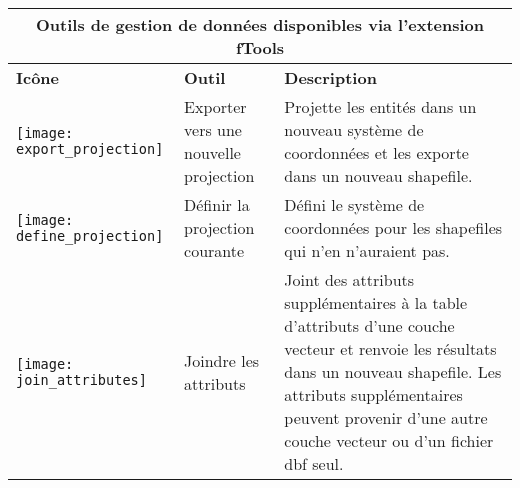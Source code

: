 \begin{table}[ht]
\centering

\begin{tabular}{|m{1cm}|m{3cm}|m{9cm}|}
 \hline \multicolumn{3}{|c|}{\textbf{Outils de gestion de données disponibles via l'extension fTools}} \\
 \hline \textbf{Icône} & \textbf{Outil} & \textbf{Description} \\
 \hline \texttt{[image: export\_projection]} & Exporter vers une nouvelle projection & Projette les entités dans un nouveau système de coordonnées et les exporte dans un nouveau shapefile. \\
 \hline \texttt{[image: define\_projection]} & Définir la projection courante & Défini le système de coordonnées pour les shapefiles qui n'en n'auraient pas. \\
 \hline \texttt{[image: join\_attributes]} & Joindre les attributs & Joint des attributs supplémentaires à la table d'attributs d'une couche vecteur et renvoie les résultats dans un nouveau shapefile. Les attributs supplémentaires peuvent provenir d'une autre couche vecteur ou d'un fichier dbf seul. \\

\end{tabular}
\end{table}
